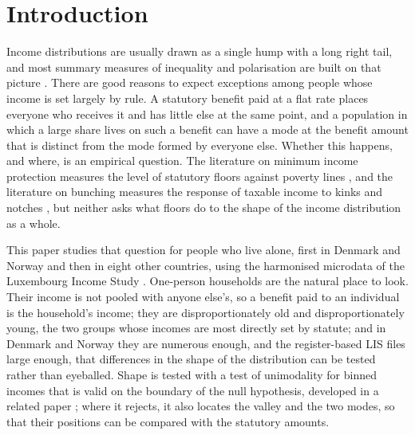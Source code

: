 \section{Introduction}\label{sec:intro}

Income distributions are usually drawn as a single hump with a long right tail, and most summary measures of inequality and polarisation are built on that picture \citep{Wolfson1994,EstebanRay1994,DuclosEstebanRay2004}. There are good reasons to expect exceptions among people whose income is set largely by rule. A statutory benefit paid at a flat rate places everyone who receives it and has little else at the same point, and a population in which a large share lives on such a benefit can have a mode at the benefit amount that is distinct from the mode formed by everyone else. Whether this happens, and where, is an empirical question. The literature on minimum income protection measures the level of statutory floors against poverty lines \citep{Bahle2011,Immervoll2012,MarxNelson2013,Goedeme2013,MarchalMarxVanMechelen2014}, and the literature on bunching measures the response of taxable income to kinks and notches \citep{Saez2010,ChettyFriedmanOlsenPistaferri2011,KlevenWaseem2013,Kleven2016}, but neither asks what floors do to the shape of the income distribution as a whole.

This paper studies that question for people who live alone, first in Denmark and Norway and then in eight other countries, using the harmonised microdata of the Luxembourg Income Study \citep{LIS2024,GornickJantti2013}. One-person households are the natural place to look. Their income is not pooled with anyone else's, so a benefit paid to an individual is the household's income; they are disproportionately old and disproportionately young, the two groups whose incomes are most directly set by statute; and in Denmark and Norway they are numerous enough, and the register-based LIS files large enough, that differences in the shape of the distribution can be tested rather than eyeballed. Shape is tested with a test of unimodality for binned incomes that is valid on the boundary of the null hypothesis, developed in a related paper \citep{Orujov2026}; where it rejects, it also locates the valley and the two modes, so that their positions can be compared with the statutory amounts.

